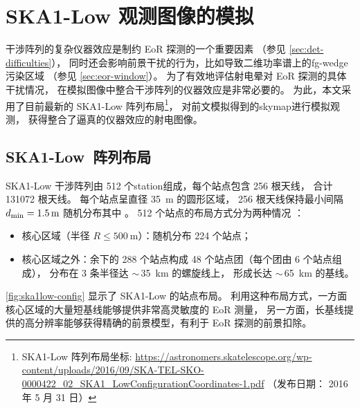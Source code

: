 \section{SKA1-Low 观测图像的模拟}
\label{sec:obs-simu}

干涉阵列的复杂仪器效应是制约 EoR 探测的一个重要因素
（参见 \autoref{sec:det-difficulties}），
同时还会影响前景干扰的行为，比如导致二维功率谱上的\ac{fg-wedge}污染区域
（参见 \autoref{sec:eor-window}）。
为了有效地评估射电晕对 EoR 探测的具体干扰情况，
在模拟图像中整合干涉阵列的仪器效应是非常必要的。
为此，本文采用了目前最新的 SKA1-Low 阵列布局\footnote{\raggedright%
  SKA1-Low 阵列布局坐标:
  \url{https://astronomers.skatelescope.org/wp-content/uploads/2016/09/SKA-TEL-SKO-0000422_02_SKA1_LowConfigurationCoordinates-1.pdf}
  （发布日期： 2016 年 5 月 31 日）}，
对前文模拟得到的\ac{skymap}进行模拟观测，
获得整合了逼真的仪器效应的射电图像。

\subsection{SKA1-Low~阵列布局}

SKA1-Low 干涉阵列由 512 个\ac{station}组成，每个站点包含 256 根天线，
合计 \num{131072} 根天线。
每个站点呈直径 \SI{35}{\meter} 的圆形区域，
256 根天线保持最小间隔 $d_{\mathrm{min}} = \SI{1.5}{\meter}$
随机分布其中 \cite{mort2017}。
512 个站点的布局方式分为两种情况 \cite{dewdney2016ska}：
\begin{itemize}
  \item 核心区域（半径 $R \le \SI{500}{\meter}$）：随机分布 224 个站点；
  \item 核心区域之外：余下的 288 个站点构成 48 个站点团（每个团由 6 个站点组成），
    分布在 3 条半径达 $\sim$\,\SI{35}{\km} 的螺旋线上，
    形成长达 $\sim$\,\SI{65}{\km} 的基线。
\end{itemize}
\autoref{fig:ska1low-config} 显示了 SKA1-Low 的站点布局。
利用这种布局方式，一方面核心区域的大量短基线能够提供非常高灵敏度的 EoR 测量，
另一方面，长基线提供的高分辨率能够获得精确的前景模型，有利于 EoR 探测的前景扣除。

